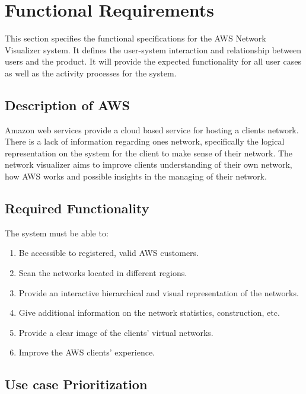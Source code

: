 \documentclass[hidelinks,a4paper,12pt]{article}
\begin{document}
\newpage
\section{Functional Requirements}
	This section specifies the functional specifications for the AWS Network Visualizer system. It defines the user-system interaction and relationship between users and the product. It will provide the expected functionality for all user cases as well as the activity processes for the system.
	
		\subsection{Description of AWS}
			Amazon web services provide a cloud based service for hosting a clients network. There is a lack of information regarding ones network, specifically the logical representation on the system for the client to make sense of their network. The network visualizer aims to improve clients understanding of their own network, how AWS works and possible insights in the managing of their network.
		\subsection{Required Functionality}
			The system must be able to:
				\begin{enumerate}  
					\item Be accessible to registered, valid AWS customers.
					\item Scan the networks located in different regions. 
					\item Provide an interactive hierarchical and visual representation of the networks.
					\item Give additional information on the network statistics, construction, etc.
					\item Provide a clear image of the clients' virtual networks.
					\item Improve the AWS clients' experience.
				\end{enumerate}
		\subsection{Use case Prioritization}
		
\end{document}
